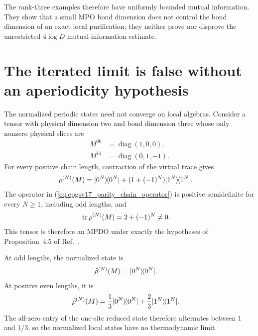 \documentclass[11pt]{article}
\begin{document}
The rank-three examples therefore have uniformly bounded mutual information.
They show that a small MPO bond dimension does not control the bond dimension
of an exact local purification; they neither prove nor disprove the
unrestricted $4\log D$ mutual-information estimate.

\section{The iterated limit is false without an aperiodicity hypothesis}

The normalized periodic states need not converge on local algebras. Consider a
tensor with physical dimension two and bond dimension three whose only nonzero
physical slices are
\begin{align}
    M^{00}
        &= \operatorname{diag}(1,0,0),
    \label{eq:cpgsv17_parity_tensor_zero_slice}\\
    M^{11}
        &= \operatorname{diag}(0,1,-1).
    \label{eq:cpgsv17_parity_tensor_one_slice}
\end{align}
For every positive chain length, contraction of the virtual trace gives
\begin{align}
    \rho^{(N)}(M)
        &=
        |0^N\rangle\!\langle 0^N|
        +
        (1+(-1)^N)|1^N\rangle\!\langle 1^N|.
    \label{eq:cpgsv17_parity_chain_operator}
\end{align}
The operator in (\ref{eq:cpgsv17_parity_chain_operator}) is positive
semidefinite for every $N\geq1$, including odd lengths, and
\begin{align}
    \operatorname{tr}\rho^{(N)}(M)
        &= 2+(-1)^N
        \neq 0.
    \label{eq:cpgsv17_parity_chain_trace}
\end{align}
This tensor is therefore an MPDO under exactly the hypotheses of
Proposition~4.5 of Ref.~\cite{Cirac2016MPDO_arXiv}.

At odd lengths, the normalized state is
\begin{align}
    \widehat\rho^{(N)}(M)
        &= |0^N\rangle\!\langle 0^N|.
    \label{eq:cpgsv17_odd_normalized_state}
\end{align}
At positive even lengths, it is
\begin{align}
    \widehat\rho^{(N)}(M)
        &=
        \frac13|0^N\rangle\!\langle 0^N|
        +
        \frac23|1^N\rangle\!\langle 1^N|.
    \label{eq:cpgsv17_even_normalized_state}
\end{align}
The all-zero entry of the one-site reduced state therefore alternates between
$1$ and $1/3$, so the normalized local states have no thermodynamic limit.
\end{document}
